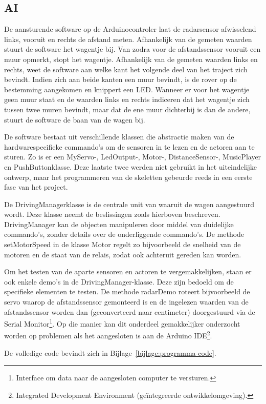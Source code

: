  
\subsection{AI}
De aansturende software op de Arduinocontroler laat de radarsensor afwisselend links, vooruit en rechts de afstand meten. Afhankelijk van de gemeten waarden stuurt de software het wagentje bij.
Van zodra voor de afstandssensor vooruit een muur opmerkt, stopt het wagentje. Afhankelijk van de gemeten waarden links en rechts, weet de software aan welke kant het volgende deel van het traject zich bevindt.
Indien zich aan beide kanten een muur bevindt, is de rover op de bestemming aangekomen en knippert een LED.
Wanneer er voor het wagentje geen muur staat en de waarden links en rechts indiceren dat het wagentje zich tussen twee muren bevindt, maar dat de ene muur dichterbij is dan de andere, stuurt de software de baan van de wagen bij.

De software bestaat uit verschillende klassen die abstractie maken van de hardwarespecifieke commando's om de sensoren in te lezen en de actoren aan te sturen.
Zo is er een MyServo-, LedOutput-, Motor-, DistanceSensor-, MusicPlayer en PushButtonklasse. Deze laatste twee werden niet gebruikt in het uiteindelijke ontwerp, maar het programmeren van de skeletten gebeurde reeds in een eerste fase van het project.

De DrivingManagerklasse is de centrale unit van waaruit de wagen aangestuurd wordt. Deze klasse neemt de beslissingen zoals hierboven beschreven. 
DrivingManager kan de objecten manipuleren door middel van duidelijke commando's, zonder details over de onderliggende commando's. 
De methode setMotorSpeed in de klasse Motor regelt zo bijvoorbeeld de snelheid van de motoren en de staat van de relais, zodat ook achteruit gereden kan worden.

Om het testen van de aparte sensoren en actoren te vergemakkelijken, staan er ook enkele demo's in de DrivingManager-klasse. Deze zijn bedoeld om de specifieke elementen te testen. 
De methode radarDemo roteert bijvoorbeeld de servo waarop de afstandssensor gemonteerd is en de ingelezen waarden van de afstandssensor worden dan (geconverteerd naar centimeter) doorgestuurd via de Serial Monitor\footnote{Interface om data naar de aangesloten computer te versturen.}. 
Op die manier kan dit onderdeel gemakkelijker onderzocht worden op problemen als het aangesloten is aan de Arduino IDE\footnote{Integrated Development Environment (geïntegreerde ontwikkelomgeving).}.

De volledige code bevindt zich in Bijlage~\ref{bijlage:programma-code}.